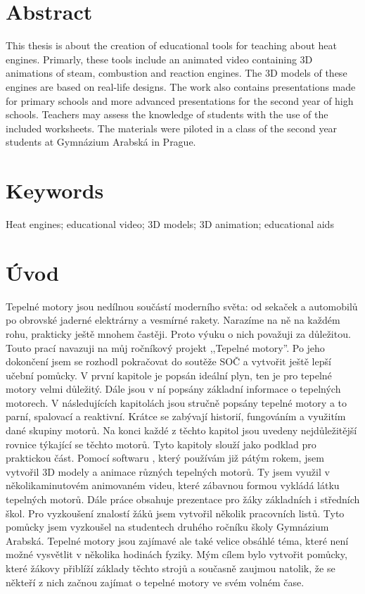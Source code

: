 \section*{Abstract}
{This thesis is about the creation of educational tools for teaching about heat engines. Primarly, these tools include an animated video containing 3D animations of steam, combustion and reaction engines. The 3D models of these engines are based on real-life designs. The work also contains presentations made for primary schools and more advanced presentations for the second year of high schools. Teachers may assess the knowledge of students with the use of the included worksheets. The materials were piloted in a class of the second year students at Gymnázium Arabská in Prague.}

\section*{Keywords}
{Heat engines; educational video; 3D models; 3D animation; educational aids}

\newpage

\tableofcontents


\newpage
\pagestyle{plain}

\section{Úvod}
{Tepelné motory jsou nedílnou součástí moderního světa: od sekaček a automobilů po obrovské jaderné elektrárny a vesmírné rakety. Narazíme na ně na každém rohu, prakticky ještě mnohem častěji. Proto výuku o nich považuji za důležitou. Touto prací navazuji na můj ročníkový projekt ,,Tepelné motory”. Po jeho dokončení jsem se rozhodl pokračovat do soutěže SOČ a vytvořit ještě lepší učební pomůcky.}\odst
{V první kapitole je popsán ideální plyn, ten je pro tepelné motory velmi důležitý. Dále jsou v ní popsány základní informace o tepelných motorech. V následujících kapitolách jsou stručně popsány tepelné motory a to parní, spalovací a reaktivní. Krátce se zabývají historií, fungováním a využitím dané skupiny motorů. Na konci každé z těchto kapitol jsou uvedeny nejdůležitější rovnice týkající se těchto motorů. Tyto kapitoly slouží jako podklad pro praktickou část.}\odst
{Pomocí softwaru , který používám již pátým rokem, jsem vytvořil 3D modely a ani\-ma\-ce různých tepelných motorů. Ty jsem využil v několikaminutovém animovaném videu, které zábavnou formou vykládá látku tepelných motorů. Dále práce obsahuje prezentace pro žáky základních i středních škol. Pro vyzkoušení znalostí žáků jsem vytvořil několik pracovních listů. Tyto pomůcky jsem vyzkoušel na studentech druhého ročníku školy Gymnázium Arabská.}\odst
{Tepelné motory jsou zajímavé ale také velice obsáhlé téma, které není možné vysvětlit v několika hodinách fyziky. Mým cílem bylo vytvořit pomůcky, které žákovy přiblíží základy těchto strojů a současně zaujmou natolik, že se někteří z nich začnou zajímat o tepelné motory ve svém volném čase.}